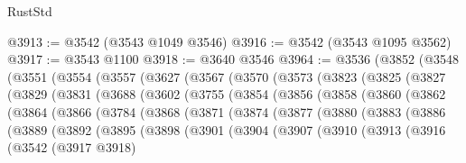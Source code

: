 \begin{lexlean}{RustStd}
\begin{coremodule}
@3913 := @3542 (@3543 @1049 @3546)
@3916 := @3542 (@3543 @1095 @3562)
@3917 := @3543 @1100
@3918 := @3640 @3546
@3964 := @3536
    (@3852
      (@3548
        (@3551
          (@3554
            (@3557
              (@3627
                (@3567
                  (@3570
                    (@3573
                      (@3823
                        (@3825
                          (@3827
                            (@3829
                              (@3831
                                (@3688
                                  (@3602
                                    (@3755
                                      (@3854
                                        (@3856
                                          (@3858
                                            (@3860
                                              (@3862
                                                (@3864
                                                  (@3866
                                                    (@3784
                                                      (@3868
                                                        (@3871
                                                          (@3874
                                                            (@3877
                                                              (@3880
                                                                (@3883
                                                                  (@3886
                                                                    (@3889
                                                                      (@3892
                                                                        (@3895
                                                                          (@3898
                                                                            (@3901
                                                                              (@3904
                                                                                (@3907
                                                                                  (@3910
                                                                                    (@3913
                                                                                      (@3916
                                                                                        (@3542
                                                                                          (@3917
                                                                                            @3918)

\end{coremodule}
\end{lexlean}
